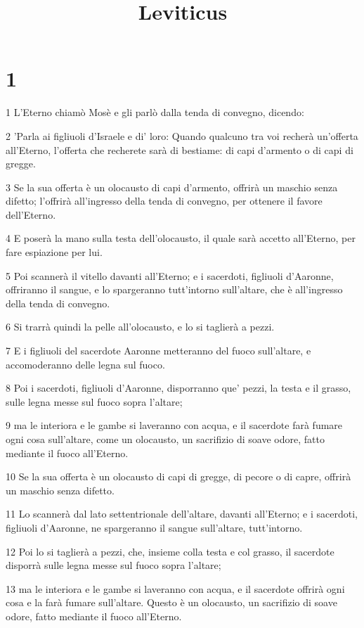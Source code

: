 

\title{Leviticus}


\chapter{1}

\par 1 L'Eterno chiamò Mosè e gli parlò dalla tenda di convegno, dicendo:
\par 2 'Parla ai figliuoli d'Israele e di' loro: Quando qualcuno tra voi recherà un'offerta all'Eterno, l'offerta che recherete sarà di bestiame: di capi d'armento o di capi di gregge.
\par 3 Se la sua offerta è un olocausto di capi d'armento, offrirà un maschio senza difetto; l'offrirà all'ingresso della tenda di convegno, per ottenere il favore dell'Eterno.
\par 4 E poserà la mano sulla testa dell'olocausto, il quale sarà accetto all'Eterno, per fare espiazione per lui.
\par 5 Poi scannerà il vitello davanti all'Eterno; e i sacerdoti, figliuoli d'Aaronne, offriranno il sangue, e lo spargeranno tutt'intorno sull'altare, che è all'ingresso della tenda di convegno.
\par 6 Si trarrà quindi la pelle all'olocausto, e lo si taglierà a pezzi.
\par 7 E i figliuoli del sacerdote Aaronne metteranno del fuoco sull'altare, e accomoderanno delle legna sul fuoco.
\par 8 Poi i sacerdoti, figliuoli d'Aaronne, disporranno que' pezzi, la testa e il grasso, sulle legna messe sul fuoco sopra l'altare;
\par 9 ma le interiora e le gambe si laveranno con acqua, e il sacerdote farà fumare ogni cosa sull'altare, come un olocausto, un sacrifizio di soave odore, fatto mediante il fuoco all'Eterno.
\par 10 Se la sua offerta è un olocausto di capi di gregge, di pecore o di capre, offrirà un maschio senza difetto.
\par 11 Lo scannerà dal lato settentrionale dell'altare, davanti all'Eterno; e i sacerdoti, figliuoli d'Aaronne, ne spargeranno il sangue sull'altare, tutt'intorno.
\par 12 Poi lo si taglierà a pezzi, che, insieme colla testa e col grasso, il sacerdote disporrà sulle legna messe sul fuoco sopra l'altare;
\par 13 ma le interiora e le gambe si laveranno con acqua, e il sacerdote offrirà ogni cosa e la farà fumare sull'altare. Questo è un olocausto, un sacrifizio di soave odore, fatto mediante il fuoco all'Eterno.

